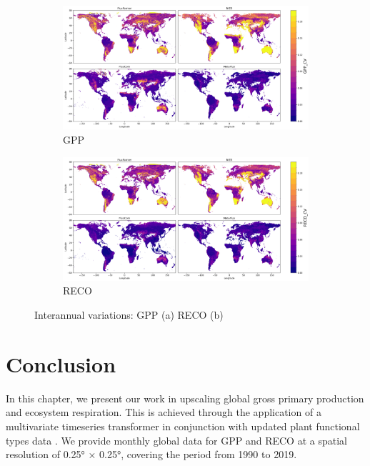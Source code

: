 \begin{figure}[tbh!]
    \centering
    \begin{subfigure}{\textwidth}
      \centering
      \includegraphics[width=\textwidth]{figs/chap6/IAV_GPP.png}
      \caption{GPP}
      \label{fig:chap6_fig8a}
    \end{subfigure}

    \begin{subfigure}{\textwidth}
      \centering
      \includegraphics[width=\textwidth]{figs/chap6/IAV_RECO.png}
      \caption{RECO}
      \label{fig:chap6_fig8b}
    \end{subfigure}
    \caption{Interannual variations: GPP (a) RECO (b)}
    \label{fig:chap6_fig8}
\end{figure}
\section{Conclusion}
In this chapter, we present our work in upscaling global gross primary production and ecosystem respiration. This is achieved through the application of a multivariate timeseries transformer \citep{zerveas2021transformer} in conjunction with updated plant functional types data \citep{harper202229}. We provide monthly global data for GPP and RECO at a spatial resolution of 0.25° × 0.25°, covering the period from 1990 to 2019. \par

